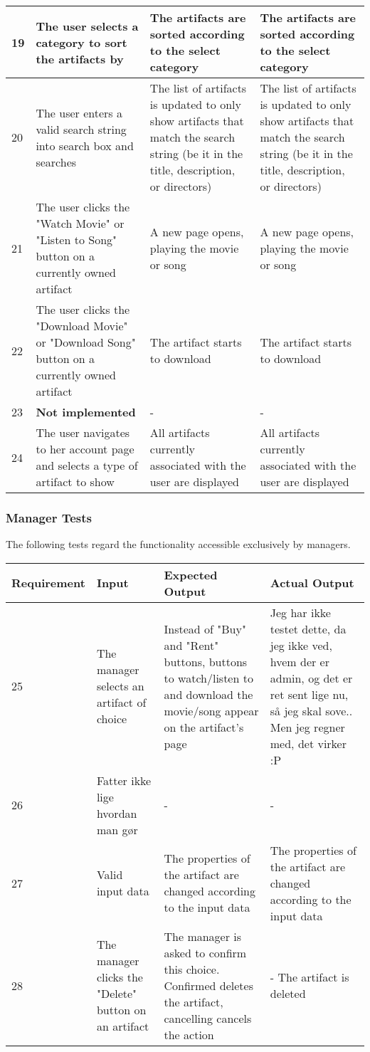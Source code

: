 {{\begin{tabular}{ | p{2cm} | p{3cm} | p{4cm} | p{4cm} | }
	\hline
	19 & The user selects a category to sort the artifacts by & The artifacts are sorted according to the select category & The artifacts are sorted according to the select category \\
	\hline
	20 & The user enters a valid search string into search box and searches & The list of artifacts is updated to only show artifacts that match the search string (be it in the title, description, or directors) & The list of artifacts is updated to only show artifacts that match the search string (be it in the title, description, or directors) \\
	\hline
	21 & The user clicks the "Watch Movie" or "Listen to Song" button on a currently owned artifact & A new page opens, playing the movie or song & A new page opens, playing the movie or song \\
	\hline
	22 & The user clicks the "Download Movie" or "Download Song" button on a currently owned artifact & The artifact starts to download & The artifact starts to download \\
	\hline
	23 & \textbf{Not implemented}  & - & - \\
	\hline
	24 & The user navigates to her account page and selects a type of artifact to show & All artifacts currently associated with the user are displayed & All artifacts currently associated with the user are displayed \\
	\hline
\end{tabular}}}

\subsubsection{Manager Tests}
The following tests regard the functionality accessible exclusively by managers. \\
{\centering
\scalebox{0.7}
{\begin{tabular}{ | p{2cm} | p{3cm} | p{4cm} | p{4cm} | }
	\hline
	Requirement & Input & Expected Output & Actual Output \\
	\hline
	25 & The manager selects an artifact of choice & Instead of "Buy" and "Rent" buttons, buttons to watch/listen to and download the movie/song appear on the artifact's page & Jeg har ikke testet dette, da jeg ikke ved, hvem der er admin, og det er ret sent lige nu, så jeg skal sove.. Men jeg regner med, det virker :P \\
	\hline
	26 & Fatter ikke lige hvordan man gør & - & - \\
	\hline
	27 & Valid input data & The properties of the artifact are changed according to the input data & The properties of the artifact are changed according to the input data \\
	\hline
	28 & The manager clicks the "Delete" button on an artifact & The manager is asked to confirm this choice. Confirmed deletes the artifact, cancelling cancels the action & - The artifact is deleted \\
	\hline
\end{tabular}}}
